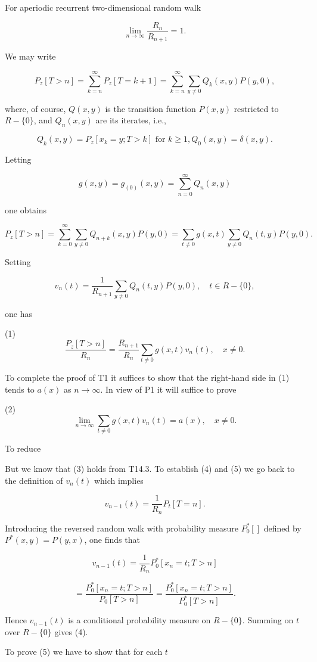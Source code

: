 For aperiodic recurrent two-dimensional random walk

$$\lim_{n \to \infty} \frac{R_n}{R_{n+1}} = 1.$$

We may write

$$P_z[T > n] = \sum_{k=n}^{\infty} P_z[T = k+1] = \sum_{k=n}^{\infty} \sum_{y \neq 0} Q_k(x,y)P(y,0),$$

where, of course, $Q(x,y)$ is the transition function $P(x,y)$ restricted to $R - \{0\}$, and $Q_n(x,y)$ are its iterates, i.e.,

$$Q_k(x,y) = P_z[x_k = y; T > k] \text{ for } k \geq 1, Q_0(x,y) = \delta(x,y).$$

Letting

$$g(x,y) = g_{(0)}(x,y) = \sum_{n=0}^{\infty} Q_n(x,y)$$

one obtains

$$P_z[T > n] = \sum_{k=0}^{\infty} \sum_{y \neq 0} Q_{n+k}(x,y)P(y,0) = \sum_{t \neq 0} g(x,t) \sum_{y \neq 0} Q_n(t,y)P(y,0).$$

Setting

$$v_n(t) = \frac{1}{R_{n+1}} \sum_{y \neq 0} Q_n(t,y)P(y,0), \quad t \in R - \{0\},$$

one has

(1) $$\frac{P_z[T > n]}{R_n} = \frac{R_{n+1}}{R_n} \sum_{t \neq 0} g(x,t)v_n(t), \quad x \neq 0.$$

To complete the proof of T1 it suffices to show that the right-hand side in (1) tends to $a(x)$ as $n \to \infty$. In view of P1 it will suffice to prove

(2) $$\lim_{n \to \infty} \sum_{t \neq 0} g(x,t)v_n(t) = a(x), \quad x \neq 0.$$

To reduce

But we know that (3) holds from T14.3. To establish (4) and (5) we go back to the definition of $v_n(t)$ which implies

$$v_{n-1}(t) = \frac{1}{R_n} P_t[T = n].$$

Introducing the reversed random walk with probability measure $P_0^*[ ]$ defined by $P^*(x,y) = P(y,x)$, one finds that

$$v_{n-1}(t) = \frac{1}{R_n} P_0^*[x_n = t; T > n]$$

$$= \frac{P_0^*[x_n = t; T > n]}{P_0[T > n]} = \frac{P_0^*[x_n = t; T > n]}{P_0^*[T > n]}.$$

Hence $v_{n-1}(t)$ is a conditional probability measure on $R - \{0\}$. Summing on $t$ over $R - \{0\}$ gives (4).

To prove (5) we have to show that for each $t$

